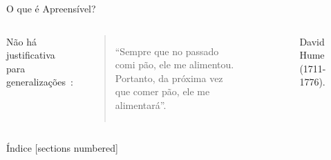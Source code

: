 \documentclass[10pt, professionalfonts]{beamer}
\begin{document}
\begin{frame}{O que é Apreensível?}
 
\begin{columns}[c]
Não há justificativa para generalizações~\cite{Hume2009Tratado}: 
\begin{quotation}
  ``Sempre que no passado comi pão, ele me alimentou. Portanto, da próxima vez que comer pão, ele me alimentará''.
\end{quotation}~\cite{hume2004investigacoes}
  \centering 
  \begin{figure}
    \label{hume}
    \caption{David Hume (1711-1776).}
  \end{figure} 
\end{columns}
\end{frame}

\begin{frame}{Índice}
  [sections numbered]
  \tableofcontents[hideallsubsections]
\end{frame}
\end{document}
